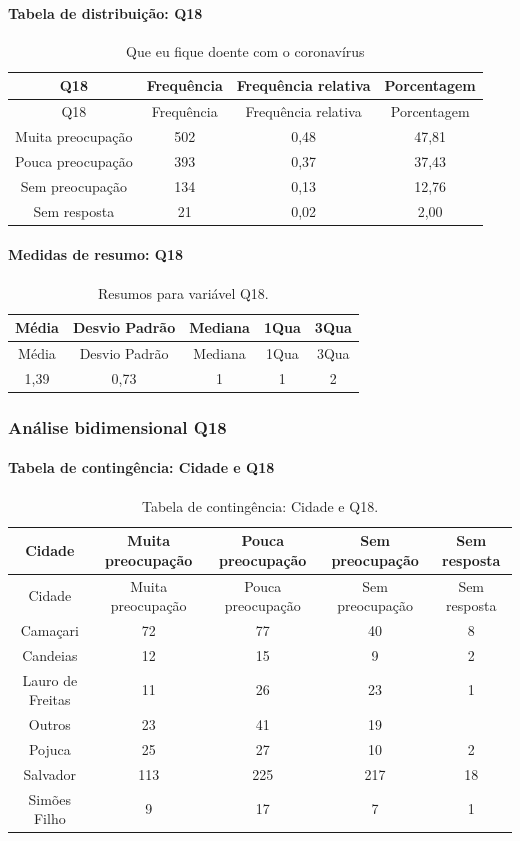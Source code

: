 \documentclass[]{article}
\let\oldparagraph\paragraph
\renewcommand{\paragraph}[1]{\oldparagraph{#1}\mbox{}}
\begin{document}
\hypertarget{tabela-de-distribuiuxe7uxe3o-q18}{%
\paragraph{Tabela de distribuição: Q18}\label{tabela-de-distribuiuxe7uxe3o-q18}}

\begin{longtable}[]{@{}cccc@{}}
\caption{\label{tab:unnamed-chunk-247}Que eu fique doente com o coronavírus}\tabularnewline
\toprule
Q18 & Frequência & Frequência relativa & Porcentagem\tabularnewline
\midrule
\endfirsthead
\toprule
Q18 & Frequência & Frequência relativa & Porcentagem\tabularnewline
\midrule
\endhead
Muita preocupação & 502 & 0,48 & 47,81\tabularnewline
Pouca preocupação & 393 & 0,37 & 37,43\tabularnewline
Sem preocupação & 134 & 0,13 & 12,76\tabularnewline
Sem resposta & 21 & 0,02 & 2,00\tabularnewline
\bottomrule
\end{longtable}

\hypertarget{medidas-de-resumo-q18}{%
\paragraph{Medidas de resumo: Q18}\label{medidas-de-resumo-q18}}

\begin{longtable}[]{@{}ccccc@{}}
\caption{\label{tab:unnamed-chunk-248}Resumos para variável Q18.}\tabularnewline
\toprule
Média & Desvio Padrão & Mediana & 1Qua & 3Qua\tabularnewline
\midrule
\endfirsthead
\toprule
Média & Desvio Padrão & Mediana & 1Qua & 3Qua\tabularnewline
\midrule
\endhead
1,39 & 0,73 & 1 & 1 & 2\tabularnewline
\bottomrule
\end{longtable}

\cleardoublepage

\hypertarget{anuxe1lise-bidimensional-q18}{%
\subsubsection{Análise bidimensional Q18}\label{anuxe1lise-bidimensional-q18}}

\hypertarget{tabela-de-continguxeancia-cidade-e-q18}{%
\paragraph{Tabela de contingência: Cidade e Q18}\label{tabela-de-continguxeancia-cidade-e-q18}}

\begin{longtable}[]{@{}ccccc@{}}
\caption{\label{tab:unnamed-chunk-249}Tabela de contingência: Cidade e Q18.}\tabularnewline
\toprule
Cidade & Muita preocupação & Pouca preocupação & Sem preocupação & Sem resposta\tabularnewline
\midrule
\endfirsthead
\toprule
Cidade & Muita preocupação & Pouca preocupação & Sem preocupação & Sem resposta\tabularnewline
\midrule
\endhead
Camaçari & 72 & 77 & 40 & 8\tabularnewline
Candeias & 12 & 15 & 9 & 2\tabularnewline
Lauro de Freitas & 11 & 26 & 23 & 1\tabularnewline
Outros & 23 & 41 & 19 &\tabularnewline
Pojuca & 25 & 27 & 10 & 2\tabularnewline
Salvador & 113 & 225 & 217 & 18\tabularnewline
Simões Filho & 9 & 17 & 7 & 1\tabularnewline
\bottomrule
\end{longtable}
\end{document}

